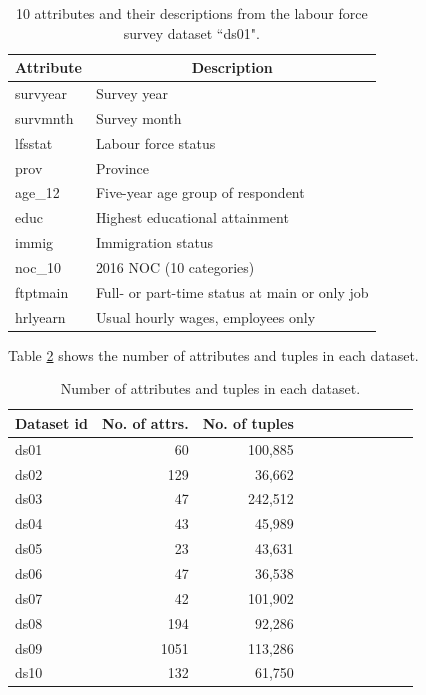 \documentclass[conference]{IEEEtran}
\begin{document}
\begin{table}[t]
	\centering
	\begin{tabular}{|l|l|}
		\hline
		\multicolumn{1}{|c|}{\textbf{Attribute}} & \multicolumn{1}{c|}{\textbf{Description}}     \\ \hline
		survyear & Survey year                        \\
		survmnth & Survey month                       \\
		lfsstat  & Labour force status                \\
		prov     & Province                           \\
		age\_12  & Five-year age group of respondent  \\
		educ     & Highest educational attainment     \\
		immig    & Immigration status                 \\
		noc\_10  & 2016 NOC (10 categories)           \\
		ftptmain                                 & Full- or part-time status at main or only job \\
		hrlyearn & Usual hourly wages, employees only \\ \hline
	\end{tabular}
	\caption{10 attributes and their descriptions from the labour force survey dataset ``ds01".}
	\label{tab:ds01_attrs_samples}
\end{table}
Table \ref{table:ds_stats} shows the number of attributes and tuples in each dataset.
\begin{table}[t]
	\centering
	\begin{tabular}{ |l|r|r|r|r|r|r|r|r|r|r| }
		\hline
		\textbf{Dataset id} & \textbf{No. of attrs.} & \textbf{No. of tuples} \\
		\hline
		ds01 & 60 & 100,885 \\
		ds02 & 129 & 36,662 \\
		ds03 & 47 & 242,512 \\
		ds04 & 43 & 45,989 \\
		ds05 & 23 & 43,631 \\
		ds06 & 47 & 36,538 \\
		ds07 & 42 & 101,902 \\
		ds08 & 194 & 92,286 \\
		ds09 & 1051 & 113,286 \\
		ds10 & 132 & 61,750 \\
		\hline
	\end{tabular}
	\caption{Number of attributes and tuples in each dataset.}
	\label{table:ds_stats}
\end{table}
\end{document}
